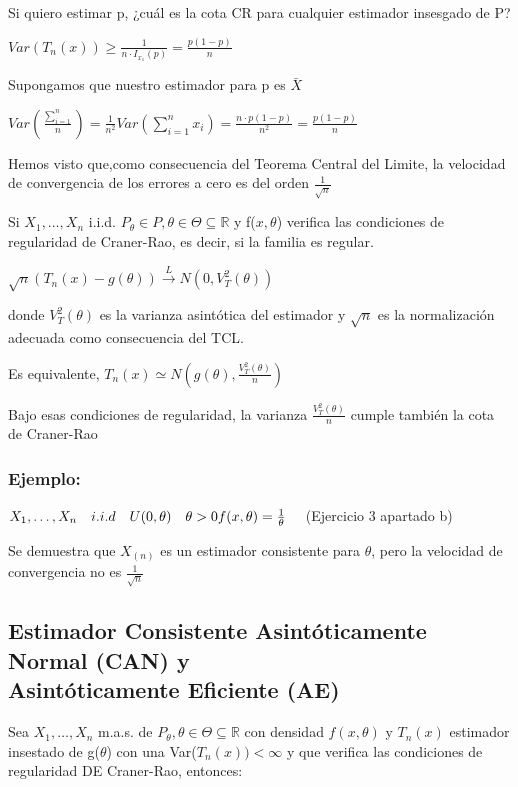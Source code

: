 Si quiero estimar p, ¿cuál es la cota CR para cualquier estimador insesgado de P?

\(
Var(T_n(x)) \geq \frac{1}{n \cdot I_{x_1}(p)}=\frac{p(1-p)}{n}
\)

Supongamos que nuestro estimador para p es $\bar{X}$

$Var(\frac{\sum_{i=1}^{n}}{n})=\frac{1}{n^2}Var(\sum_{i=1}^{n} x_i)
    =\frac{n \cdot p(1-p)}{n^2}=\frac{p(1-p)}{n}$

Hemos visto que,como consecuencia del Teorema Central del Limite,  la velocidad de convergencia de los errores a cero es del orden $\frac{1}{\sqrt{n}}$

Si $X_1,\dots,X_n$ i.i.d. $P_\theta \in P,\theta \in \Theta \subseteq \mathbb{R}$ y f($x,\theta$)
verifica las condiciones de regularidad de Craner-Rao, es decir, si la familia es regular.

$\sqrt{n}(T_n(x)-g(\theta)) \xrightarrow{L} N(0,V_T^2(\theta))$

donde $V_T^2(\theta)$ es la varianza asintótica del estimador y $\sqrt{n}$ es la normalización
adecuada como consecuencia del TCL.

Es equivalente, $T_n(x) \simeq N(g(\theta),\frac{V_T^2(\theta)}{n})$

Bajo esas condiciones de regularidad, la varianza $\frac{V_T^2(\theta)}{n}$
cumple también la cota de Craner-Rao

\subsubsection*{Ejemplo:}

\(
X_1,\dots,X_n \quad i.i.d \quad U(0,\theta) \quad \theta>0
\\f(x,\theta)= \frac{1}{\theta} \quad
\)
(Ejercicio 3 apartado b)

Se demuestra que $X_{(n)}$ es un estimador consistente para $\theta$, pero la velocidad de convergencia no es $\frac{1}{\sqrt{n}}$

\subsection{Estimador Consistente Asintóticamente Normal (CAN) y \texorpdfstring{\\}{ } Asintóticamente Eficiente (AE)}

Sea $X_1,\dots,X_n$ m.a.s. de $P_\theta, \theta \in \Theta \subseteq \mathbb{R}$
con densidad $f(x,\theta)$ y $T_n(x)$ estimador insestado de g($\theta$) con una Var($T_n(x))<\infty$
y que verifica las condiciones de regularidad DE Craner-Rao, entonces:


